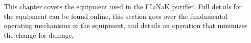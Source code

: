 %
%

\label{chap: equipment}

This chapter covers the equipment used in the FLiNaK purifier. Full details
for the equipment can be found online, this section goes over the fundamental
operating mechanisms of the equipment, and details on operation that
minimizes the change for damage.\par

